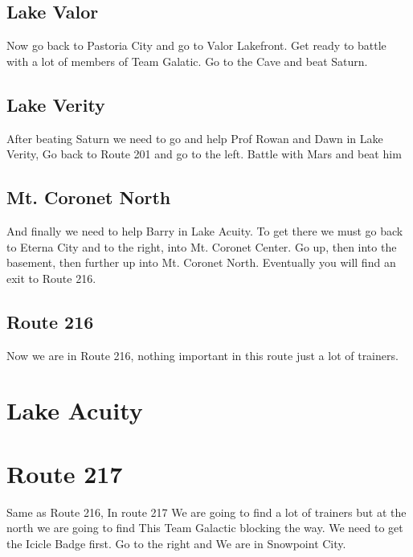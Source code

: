 \documentclass[11pt]{article}
\begin{document}
\subsection{Lake Valor}\label{subsec:lake-valor}
Now go back to Pastoria City and go to Valor Lakefront.
Get ready to battle with a lot of members of Team Galatic.
Go to the Cave and beat Saturn.





\subsection{Lake Verity}\label{subsec:lake-verity}
After beating Saturn we need to go and help Prof Rowan and Dawn in Lake Verity, Go back to Route 201 and go to the left.
Battle with Mars and beat him

\subsection{Mt. Coronet North}\label{subsec:mt.-coronet-north}
And finally we need to help Barry in Lake Acuity.
To get there we must go back to Eterna City and to the right, into Mt. Coronet Center.
Go up, then into the basement, then further up into Mt. Coronet North.
Eventually you will find an exit to Route 216.



\subsection{Route 216}\label{subsec:route-2162}
Now we are in Route 216, nothing important in this route just a lot of trainers.



\section{Lake Acuity}\label{sec:lake-acuity}

\section{Route 217}\label{sec:route-217}
Same as Route 216, In route 217 We are going to find a lot of trainers
but at the north we are going to find This Team Galactic blocking the way.
We need to get the Icicle Badge first.
Go to the right and We are in Snowpoint City.
\end{document}
